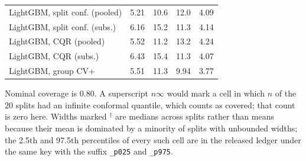 \begin{table}[!tp]
\begin{tabular}{@{}lrrrr@{}}
\quad LightGBM, split conf. (pooled) & 5.21 & 10.6 & 12.0 & 4.09 \\
\quad LightGBM, split conf. (subs.) & 6.16 & 15.2 & 11.3 & 4.14 \\
\quad LightGBM, CQR (pooled) & 5.52 & 11.2 & 13.2 & 4.24 \\
\quad LightGBM, CQR (subs.) & 6.43 & 15.4 & 11.3 & 4.07 \\
\quad LightGBM, group CV+ & 5.51 & 11.3 & 9.94 & 3.77 \\
\bottomrule
\end{tabular}
\par\smallskip\raggedright\footnotesize Nominal coverage is 0.80. A superscript $n\infty$ would mark a cell in which $n$ of the 20 splits had an infinite conformal quantile, which counts as covered; that count is zero here. Widths marked $^{\dagger}$ are medians across splits rather than means because their mean is dominated by a minority of splits with unbounded widths; the 2.5th and 97.5th percentiles of every such cell are in the released ledger under the same key with the suffix \texttt{\_p025} and \texttt{\_p975}. 
\end{table}
